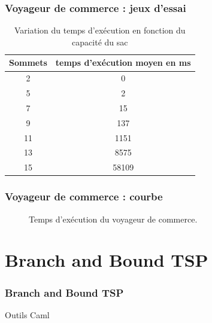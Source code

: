 \documentclass[french]{beamer}
\begin{document}
\begin{frame}
\frametitle{Voyageur de commerce : jeux d'essai}
\begin{table}[h!]
\centering
\begin{tabular}{|c|c|}
\hline
Sommets & temps d'exécution moyen en ms\\
\hline
2 & 0\\
\hline
5 & 2\\
\hline
7 & 15\\
\hline
9 & 137\\
\hline
11 & 1151\\
\hline
13 & 8575\\
\hline
15 & 58109\\
\hline
\end{tabular}
\caption {Variation du temps d'exécution en fonction du capacité du sac}
\end{table}
\end{frame}

\begin{frame}
\frametitle{Voyageur de commerce : courbe}
\begin{figure}[h!]
\centering
{}
\caption{Temps d'exécution du voyageur de commerce.}
\end{figure}
\end{frame}

\section{Branch and Bound TSP}

\begin{frame}
  \frametitle{Branch and Bound TSP}
  \begin{block}{Outils}
Caml
  \end{block}
\end{frame}
\end{document}
